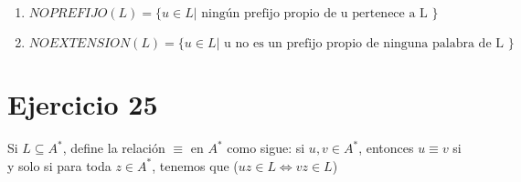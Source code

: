 \documentclass[a4paper, 11pt]{article}
\begin{document}
\begin{enumerate}
\item $NOPREFIJO(L)=\{u\in L | \text{ ningún prefijo propio de u pertenece a L }\}$

\item $NOEXTENSION(L)=\{u\in L | \text{ u no es un prefijo propio de ninguna palabra de L }\}$
\end{enumerate}
 
\section*{Ejercicio 25}

Si $L\subseteq A^*$, define la relación $\equiv$ en $A^*$ como sigue: si $u,v\in A^*$, entonces $u\equiv v $ si y solo si para toda $z\in A^*$, tenemos que ($uz\in L \Longleftrightarrow vz\in L$)
\end{document}
